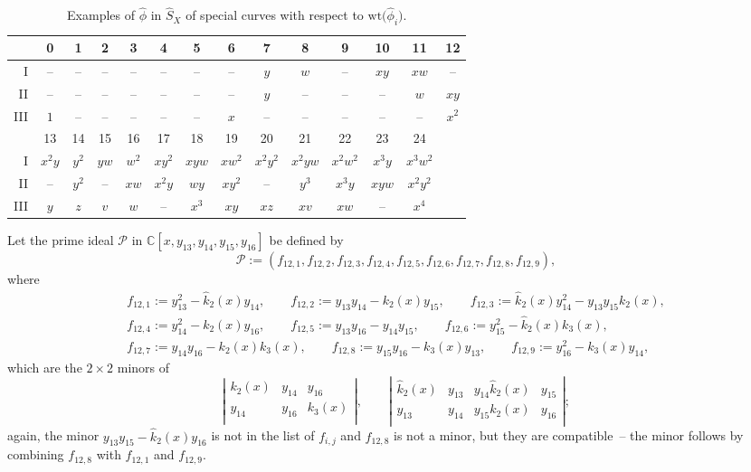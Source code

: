 \documentclass[10pt,a4paper]{amsart}
\def\CC{{\mathbb C}}
\def\cP{{\mathcal P}}
\def\hk{{\widehat k}}
\def\hS{{\widehat S}}
\def\hphi{{\widehat \phi}}
\def\wt{{\mathrm {wt}}}
\numberwithin{equation}{section}
\begin{document}
\begin{table}[t]\centering
 \caption{Examples of $\hphi$ in $\hS_X$ of special curves with respect to $\wt\big(\hphi_i\big)$.}\vspace{1mm}
\renewcommand{\arraystretch}{1.3}\small
 \begin{tabular}{|r|ccccccccccccc|}
\hline
 &0&1&2&3&4&5&6&7&8&9&10&11&12\\
\hline
I&--&--&--&--&--&--&--&$y$&$w$&--&$xy$&$xw$&
 --\\
II&--&--&--&--&--&--&--&$y$&--&--&--&$w$&$xy$\\
III&$1$&--&--&--&--&--&$x$&--&--&--&--&--&$x^2$\\
\hline
\hline
&13&14&15&16& 17&18&19&20&21&22&23&24&\\
\hline
I&$x^2y$&$y^2$&$yw$&$w^2$&$xy^2$&$xyw$&$xw^2$&$x^2y^2$&
 $x^2yw$&$x^2w^2$&$x^3y$&$x^3w^2$&\\
II&--&$y^2$&--&$xw$&$x^2y$&$wy$&$xy^2$&--&$y^3$&$x^3y$&$xyw$&$x^2y^2$&\\
III&$y$&$z$&$v$&$w$&--&$x^3$&$xy$&$xz$&$xv$&$xw$&--&$x^4$&\\
\hline
 \end{tabular}
\end{table}

Let the prime ideal $\cP$ in $\CC[x, y_{13}, y_{14}, y_{15}, y_{16}]$ be defined by
\begin{equation*}
 \cP := (f_{12, 1}, f_{12, 2}, f_{12, 3}, f_{12, 4},
f_{12, 5}, f_{12, 6}, f_{12, 7}, f_{12, 8}, f_{12, 9}),
\end{equation*}
where
\begin{gather*}
f_{12,1} := y_{13}^{2} - \hk_{2}(x) y_{14}, \qquad
f_{12,2} := y_{13} y_{14} - k_{2}(x) y_{15}, \qquad
f_{12,3} :=\hk_2(x) y_{14}^{2} - y_{13} y_{15} k_2(x),\! \\
f_{12,4} := y_{14}^{2} - k_{2}(x) y_{16} , \qquad
f_{12,5} :=y_{13}y_{16} - y_{14} y_{15}, \qquad
f_{12,6} := y_{15}^{2} - \hk_2(x)k_3(x), \\
f_{12,7} := y_{14}y_{16} - k_2(x)k_3(x), \qquad
f_{12,8} := y_{15} y_{16} - k_3(x)y_{13}, \qquad
f_{12,9} := y_{16}^{2} - k_3(x)y_{14},
\end{gather*}
which are the $2 \times 2$ minors of
\begin{equation*}
\left|\begin{matrix}
 k_2(x) & y_{14} & y_{16} \\
 y_{14} & y_{16} & k_3(x)\\
\end{matrix} \right|, \qquad
\left|\begin{matrix}
 \hk_2(x) & y_{13} & y_{14} \hk_2(x) & y_{15} \\
 y_{13} & y_{14} & y_{15} k_2(x) & y_{16} \\
\end{matrix} \right|;
\end{equation*}
again, the minor $y_{13} y_{15} - \hk_2(x) y_{16}$ is not in the list of $f_{i,j}$ and $f_{12,8}$ is not a minor, but they are compatible~-- the minor follows by combining $f_{12,8}$ with $f_{12,1}$ and $f_{12,9}$.
\end{document}
